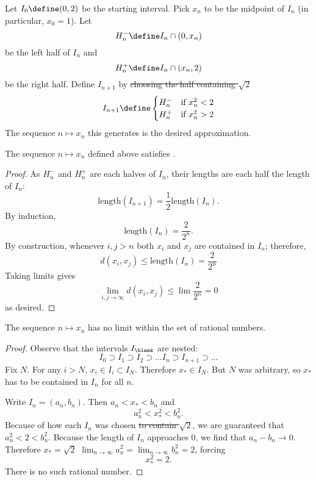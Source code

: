 \documentclass{scrartcl}
\newcommand{\dist}{d}
\begin{document}
\begin{defn}

  Let $I_{0}\define(0,2)$ be the starting interval. Pick $x_{n}$ to be the midpoint of $I_{n}$ (in particular, $x_{0}=1$). Let \[H_{n}^{-}\define I_{n}\cap (0,x_{n})\] be the left half of $I_{n}$ and
  \[H_{n}^{+}\define I_{n}\cap (x_{n},2)\] be the right half.
  Define $I_{{n+1}}$ by \sout{choosing the half containing $\sqrt 2$}
  \[
    I_{{n+1}} \define
    \begin{cases}
      H_{n}^{-}& \textrm{if } x_{n}^{2} < 2 \\
      H_{n}^{+}& \textrm{if } x_{n}^{2} > 2
    \end{cases}
  \]
  The sequence $n \mapsto x_{n}$ this generates is the desired approximation.
\end{defn}
\begin{theorem}
  The sequence $n\mapsto x_{n}$ defined above satisfies .
\end{theorem}
\begin{proof}
  As $H_{n}^{-}$ and $H_{n}^{+}$ are each halves of $I_{n}$, their lengths are each half the length of $I_{n}$:
  \[
    \textrm{length}(I_{n+1}) = \frac 1 2 \textrm{length}(I_{n}).
  \]
  By induction, \[
    \textrm{length}(I_{n}) = \frac{2}{2^{n}}.
  \]
  By construction, whenever $i,j > n$ both $x_{i}$ and $x_{j}$ are contained in $I_{n}$; therefore,
  \[
    \dist(x_{i},x_{j}) \leq \textrm{length}(I_{n}) = \frac{2}{2^{n}}
  \]
  Taking limits gives
  \[
    \lim_{{i,j}\to\infty} \dist(x_{i},x_{j}) \leq \lim \frac{2}{2^{n}} = 0
  \]
  as desired.
\end{proof}

\begin{theorem}
  The sequence $n\mapsto x_{n}$ has no limit within the set of rational numbers.
\end{theorem}
\begin{proof}
  Observe that the intervals $I_{\blank}$ are nested:
  \[
    I_{0} \supset I_{1} \supset I_{2} \supset \dots I_{n} \supset I_{n+1} \supset \dots
  \]
  Fix $N$. For any $i> N$, $x_{i}\in I_{i} \subset I_{N}$. Therefore $x_{*}\in I_{N}$. But $N$ was arbitrary, so $x_{*}$ has to be contained in $I_{n}$ for all $n$.

  Write $I_{n} = (a_{n},b_{n})$. Then $a_{n}< x_{*} < b_{n}$ and
  \[a_{n}^{2} < x_{*}^{2} < b_{n}^{2}.\]
  Because of how each $I_{n}$ was chosen \sout{to contain $\sqrt 2$}, we are guaranteed that \(a_{n}^{2}< 2 < b_{n}^{2}\). Because the length of $I_{n}$ approaches $0$, we find that $a_{n}-b_{n}\to 0$. Therefore \sout{\(x_{*}=\sqrt 2\)} $\lim_{{n\to\infty}} a_{n}^{2}=\lim_{{n\to\infty}}b_{n}^{2} = 2$, forcing
  \[
    x_{*}^{2} = 2.
  \]
  There is no such rational number.
\end{proof}
\end{document}

